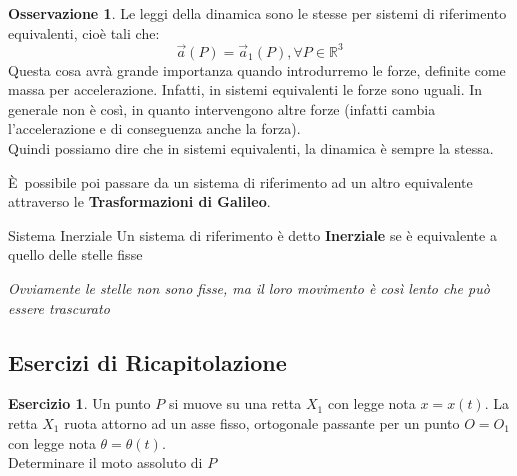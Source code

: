 \documentclass[11pt,a4paper,twoside]{article}
\theoremstyle{definition}
\newtheorem*{oss}{Osservazione}
\newtheorem{ese}{Esercizio}[section]
\begin{document}
\begin{oss}
	Le leggi della dinamica sono le stesse per sistemi di riferimento equivalenti, cioè tali che:
	\[ \vec a(P) = \vec a_1(P), \forall P \in \mathbb R^3 \]
	Questa cosa avrà grande importanza quando introdurremo le forze, definite come massa per accelerazione. Infatti, in sistemi equivalenti le forze sono uguali. In generale non è così, in quanto intervengono altre forze (infatti cambia l'accelerazione e di conseguenza anche la forza).\\
	Quindi possiamo dire che in sistemi equivalenti, la dinamica è sempre la stessa.
\end{oss}

È possibile poi passare da un sistema di riferimento ad un altro equivalente attraverso le \textbf{Trasformazioni di Galileo}.

\begin{defn}{Sistema Inerziale}{}
	Un sistema di riferimento è detto \textbf{Inerziale} se è equivalente a quello delle stelle fisse
\end{defn}

\textit{Ovviamente le stelle non sono fisse, ma il loro movimento è così lento che può essere trascurato}

\subsection{Esercizi di Ricapitolazione}

\begin{ese}
	Un punto $P$ si muove su una retta $X_1$ con legge nota $x=x(t)$. La retta $X_1$ ruota attorno ad un asse fisso, ortogonale passante per un punto $O = O_1$ con legge nota $\theta = \theta(t)$.\\
	Determinare il moto assoluto di $P$
\end{ese}
\end{document}

